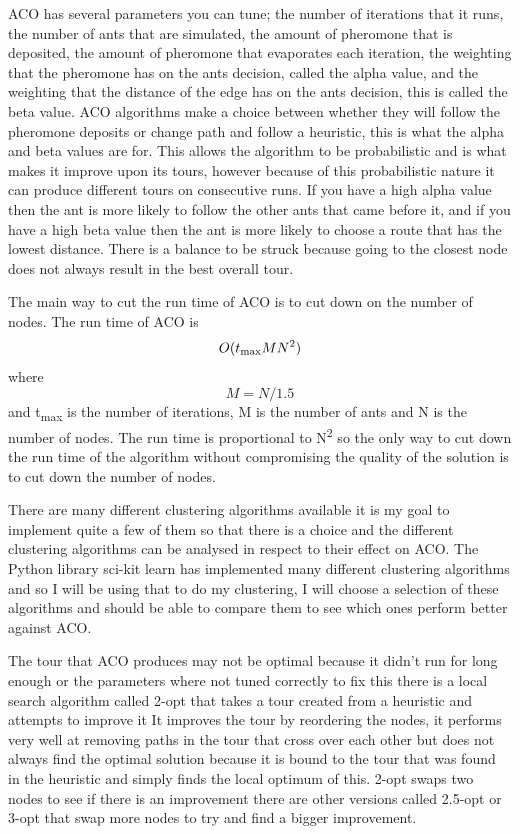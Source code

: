 ACO has several parameters you can tune; the number of iterations that it runs, the number of ants that are simulated, the amount of pheromone that is deposited, the amount of pheromone that evaporates each iteration, the weighting that the pheromone has on the ants decision, called the alpha value, and the weighting that the distance of the edge has on the ants decision, this is called the beta value. ACO algorithms make a choice between whether they will follow the pheromone deposits or change path and follow a heuristic, this is what the alpha and beta values are for. This allows the algorithm to be probabilistic and is what makes it improve upon its tours, however because of this probabilistic nature it can produce different tours on consecutive runs. If you have a high alpha value then the ant is more likely to follow the other ants that came before it, and if you have a high beta value then the ant is more likely to choose a route that has the lowest distance. There is a balance to be struck because going to the closest node does not always result in the best overall tour.

The main way to cut the run time of ACO is to cut down on the number of nodes. The run time of ACO is \[O(t\textsubscript{max}MN^2)\] where \[M=N/1.5\] and t\textsubscript{max} is the number of iterations, M is the number of ants and N is the number of nodes\cite{pang_chao-yang_ben-qiong_zhang_jie_wei_shan_zheng-chao_2014}. The run time is proportional to N\textsuperscript{2} so the only way to cut down the run time of the algorithm without compromising the quality of the solution is to cut down the number of nodes.

There are many different clustering algorithms available it is my goal to implement quite a few of them so that there is a choice and the different clustering algorithms can be analysed in respect to their effect on ACO. The Python library sci-kit learn\cite{scikit_learn_python_library} has implemented many different clustering algorithms\cite{scikit_clustering} and so I will be using that to do my clustering, I will choose a selection of these algorithms and should be able to compare them to see which ones perform better against ACO.

The tour that ACO produces may not be optimal because it didn't run for long enough or the parameters where not tuned correctly to fix this there is a local search algorithm called 2-opt that takes a tour created from a heuristic and attempts to improve it\cite{venhuis_2019} It improves the tour by reordering the nodes, it performs very well at removing paths in the tour that cross over each other but does not always find the optimal solution because it is bound to the tour that was found in the heuristic and simply finds the local optimum of this. 2-opt swaps two nodes to see if there is an improvement there are other versions called 2.5-opt or 3-opt that swap more nodes to try and find a bigger improvement. 


